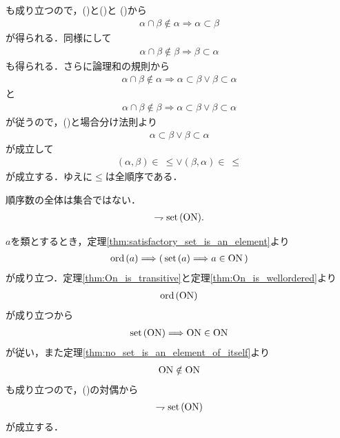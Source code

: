 \begin{sketch}
\begin{align}
				\end{align}
				も成り立つので，()と()と
				()から
				\begin{align}
					\alpha \cap \beta \notin \alpha \Longrightarrow \alpha \subset \beta
				\end{align}
				が得られる．同様にして
				\begin{align}
					\alpha \cap \beta \notin \beta \Longrightarrow \beta \subset \alpha
				\end{align}
				も得られる．さらに論理和の規則から
				\begin{align}
					\alpha \cap \beta \notin \alpha \Longrightarrow \alpha \subset \beta \vee \beta \subset \alpha
				\end{align}
				と
				\begin{align}
					\alpha \cap \beta \notin \beta \Longrightarrow \alpha \subset \beta \vee \beta \subset \alpha
				\end{align}
				が従うので，()と場合分け法則より
				\begin{align}
					\alpha \subset \beta \vee \beta \subset \alpha
				\end{align}
				が成立して
				\begin{align}
					(\alpha,\beta) \in\ \leq \vee (\beta,\alpha) \in\ \leq
				\end{align}
				が成立する．ゆえに$\leq$は全順序である．
	\end{sketch}
	
	\begin{screen}
		\begin{thm}\label{thm:Burali_Forti}
			順序数の全体は集合ではない．
			\begin{align}
				\rightharpoondown \operatorname*{set}\hspace{0.15em}(\mathrm{ON}).
			\end{align}
		\end{thm}
	\end{screen}
	
	\begin{prf}
		$a$を類とするとき，定理\ref{thm:satisfactory_set_is_an_element}より
		\begin{align}
			\operatorname*{ord}\hspace{0.15em}(a) \Longrightarrow \left(\, \operatorname*{set}\hspace{0.15em}(a) \Longrightarrow a \in \mathrm{ON}\, \right)
		\end{align}
		が成り立つ．定理\ref{thm:On_is_transitive}と定理\ref{thm:On_is_wellordered}より
		\begin{align}
			\operatorname*{ord}\hspace{0.15em}(\mathrm{ON})
		\end{align}
		が成り立つから
		\begin{align}
			\operatorname*{set}\hspace{0.15em}(\mathrm{ON}) \Longrightarrow \mathrm{ON} \in \mathrm{ON}
			\label{eq:Burali_Forti_1}
		\end{align}
		が従い，また定理\ref{thm:no_set_is_an_element_of_itself}より
		\begin{align}
			\mathrm{ON} \notin \mathrm{ON}
		\end{align}
		も成り立つので，()の対偶から
		\begin{align}
			\rightharpoondown \operatorname*{set}\hspace{0.15em}(\mathrm{ON})
		\end{align}
		が成立する．
		\QED
	\end{prf}